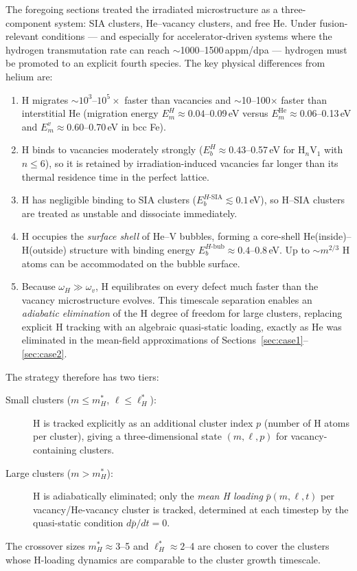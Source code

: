 \documentclass[pdflatex,sn-basic]{sn-jnl} %
\begin{document}
The foregoing sections treated the irradiated microstructure as a
three-component system: SIA clusters, He--vacancy clusters, and free He.
Under fusion-relevant conditions --- and especially for accelerator-driven
systems where the hydrogen transmutation rate can reach
$\sim$1000--1500\,appm/dpa --- hydrogen must be promoted to an explicit
fourth species.  The key physical differences from helium are:
\begin{enumerate}
  \item H migrates $\sim10^3$--$10^5\times$ faster than vacancies and
        $\sim$10--100$\times$ faster than interstitial He (migration
        energy $E_m^H \approx 0.04$--0.09\,eV versus
        $E_m^{\mathrm{He}} \approx 0.06$--0.13\,eV and
        $E_m^v \approx 0.60$--0.70\,eV in bcc Fe).
  \item H binds to vacancies moderately strongly ($E_b^H \approx
        0.43$--0.57\,eV for H$_n$V$_1$ with $n \leq 6$), so it is
        retained by irradiation-induced vacancies far longer than its
        thermal residence time in the perfect lattice.
  \item H has negligible binding to SIA clusters
        ($E_b^{H\text{-SIA}} \lesssim 0.1$\,eV), so H--SIA clusters
        are treated as unstable and dissociate immediately.
  \item H occupies the \emph{surface shell} of He--V bubbles, forming a
        core-shell He(inside)--H(outside) structure with binding energy
        $E_b^{H\text{-bub}} \approx 0.4$--0.8\,eV.  Up to $\sim m^{2/3}$
        H atoms can be accommodated on the bubble surface.
  \item Because $\omega_H \gg \omega_v$, H equilibrates on every defect
        much faster than the vacancy microstructure evolves.  This
        timescale separation enables an \emph{adiabatic elimination} of
        the H degree of freedom for large clusters, replacing explicit H
        tracking with an algebraic quasi-static loading, exactly as He
        was eliminated in the mean-field approximations of
        Sections~\ref{sec:case1}--\ref{sec:case2}.
\end{enumerate}

The strategy therefore has two tiers:
\begin{description}
  \item[Small clusters ($m \leq m_H^*$, $\ell \leq \ell_H^*$):]
        H is tracked explicitly as an additional cluster index $p$ (number
        of H atoms per cluster), giving a three-dimensional state
        $(m, \ell, p)$ for vacancy-containing clusters.
  \item[Large clusters ($m > m_H^*$):]
        H is adiabatically eliminated; only the \emph{mean H loading}
        $\bar{p}(m,\ell,t)$ per vacancy/He-vacancy cluster is tracked,
        determined at each timestep by the quasi-static condition
        $d\bar{p}/dt = 0$.
\end{description}
The crossover sizes $m_H^* \approx 3$--5 and $\ell_H^* \approx 2$--4
are chosen to cover the clusters whose H-loading dynamics are comparable
to the cluster growth timescale.
\end{document}
